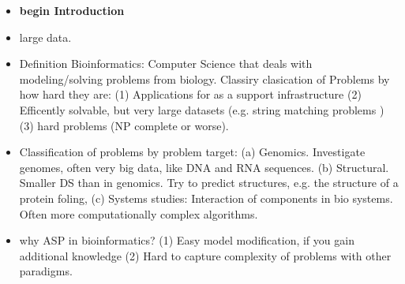 \documentclass[runningheads]{llncs}
\begin{document}
\begin{itemize}
    \item \textbf{begin Introduction}
    \item large data. 
    \item Definition Bioinformatics: Computer Science that deals with modeling/solving problems from biology. Classiry clasication of Problems by how hard they are: (1) Applications for as a support infrastructure (2) Efficently solvable, but very large datasets (e.g. string matching problems \cite{gonnet2004some}) (3) hard problems (NP complete or worse). 
    \item Classification of problems by problem target: (a) Genomics. Investigate genomes, often very big data, like DNA and RNA sequences. (b) Structural. Smaller DS than in genomics. Try to predict structures, e.g. the structure of a protein foling, (c) Systems studies: Interaction of components in bio systems. Often more computationally complex algorithms. 
    \item why ASP in bioinformatics? (1) Easy model modification, if you gain additional knowledge (2) Hard to capture complexity of problems with other paradigms. 
    

\end{itemize}
\end{document}
